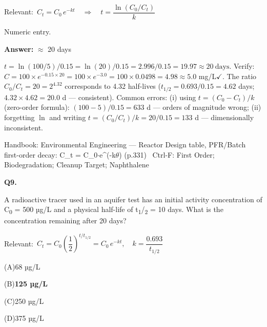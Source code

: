 \documentclass[11pt]{article}
\newcommand{\correct}[1]{\textbf{#1}\;{\color{accent}$\checkmark$}}
\newcommand{\optline}[2]{\par\noindent\hspace{1.2em}(#1)\hspace{0.6em}#2}
\begin{document}
{\small\color{soft}Relevant:}\ $C_t = C_0\,e^{-kt}\quad\Rightarrow\quad t = \dfrac{\ln(C_0/C_t)}{k}$\par\vspace{3pt}
{\small\color{soft}Numeric entry.}\par\vspace{3pt}
\vspace{2pt}\par\noindent\colorbox{boxbg}{\parbox{\dimexpr\linewidth-2\fboxsep\relax}{%
\vspace{2pt}\textbf{Answer:} $\approx$ 20 days\par\vspace{2pt}
{\small $t = \ln(100/5)/0.15 = \ln(20)/0.15 = 2.996/0.15 = 19.97\approx20\ \mathrm{days}$. Verify: $C = 100\times e^{-0.15\times20} = 100\times e^{-3.0} = 100\times0.0498 = 4.98\approx5.0$ mg/L$\checkmark$. The ratio $C_0/C_t = 20 = 2^{4.32}$ corresponds to 4.32 half-lives ($t_{1/2} = 0.693/0.15 = 4.62$ days; $4.32\times4.62 = 20.0$ d --- consistent). Common errors: (i) using $t = (C_0-C_t)/k$ (zero-order formula): $(100-5)/0.15 = 633$ d --- orders of magnitude wrong; (ii) forgetting $\ln$ and writing $t = (C_0/C_t)/k = 20/0.15 = 133$ d --- dimensionally inconsistent.}\par\vspace{2pt}
{\footnotesize\color{soft}Handbook: Environmental Engineering --- Reactor Design table, PFR/Batch first-order decay: C\_t = C\_0$\cdot$e\textasciicircum{}(-k$\theta$) (p.331) \textbullet\ Ctrl-F: First Order; Biodegradation; Cleanup Target; Naphthalene}\vspace{2pt}
}}
\vspace{9pt}
\filbreak
\textbf{\color{accent}Q9.}\par\vspace{2pt}
A radioactive tracer used in an aquifer test has an initial activity concentration of C\textsubscript{0} = 500 µg/L and a physical half-life of t\textsubscript{1}/\textsubscript{2} = 10 days. What is the concentration remaining after 20 days?\par\vspace{3pt}
{\small\color{soft}Relevant:}\ $C_t = C_0\left(\dfrac{1}{2}\right)^{t/t_{1/2}} = C_0\,e^{-kt},\quad k=\dfrac{0.693}{t_{1/2}}$\par\vspace{3pt}
\optline{A}{68 µg/L}
\optline{B}{\correct{125 µg/L}}
\optline{C}{250 µg/L}
\optline{D}{375 µg/L}
\end{document}
